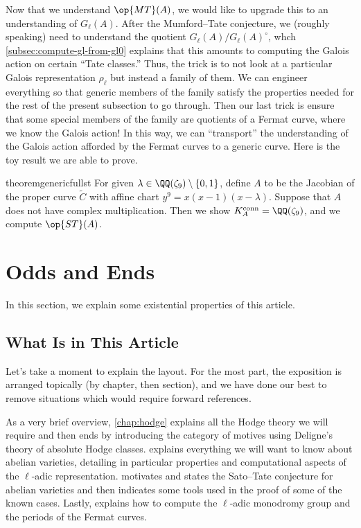 \documentclass[openany]{book}
\begin{document}
Now that we understand $\op{MT}(A)$, we would like to upgrade this to an understanding of $G_\ell(A)$. After the Mumford--Tate conjecture, we (roughly speaking) need to understand the quotient $G_\ell(A)/G_\ell(A)^\circ$, whch \cref{subsec:compute-gl-from-gl0} explains that this amounts to computing the Galois action on certain ``Tate classes.'' Thus, the trick is to not look at a particular Galois representation $\rho_\ell$ but instead a family of them. We can engineer everything so that generic members of the family satisfy the properties needed for the rest of the present subsection to go through. Then our last trick is ensure that some special members of the family are quotients of a Fermat curve, where we know the Galois action! In this way, we can ``transport'' the understanding of the Galois action afforded by the Fermat curves to a generic curve. Here is the toy result we are able to prove.
\begin{restatable*}{theorem}{genericfullst}
	For given $\lambda\in\QQ(\zeta_9)\setminus\{0,1\}$, define $A$ to be the Jacobian of the proper curve $\widetilde C$ with affine chart $y^9=x(x-1)(x-\lambda)$. Suppose that $A$ does not have complex multiplication. Then we show $K_A^{\mathrm{conn}}=\QQ(\zeta_9)$, and we compute $\op{ST}(A)$.
\end{restatable*}

\section{Odds and Ends}
In this section, we explain some existential properties of this article.

\subsection{What Is in This Article}
Let's take a moment to explain the layout. For the most part, the exposition is arranged topically (by chapter, then section), and we have done our best to remove situations which would require forward references.

As a very brief overview, \cref{chap:hodge} explains all the Hodge theory we will require and then ends by introducing the category of motives using Deligne's theory of absolute Hodge classes.  explains everything we will want to know about abelian varieties, detailing in particular properties and computational aspects of the $\ell$-adic representation.  motivates and states the Sato--Tate conjecture for abelian varieties and then indicates some tools used in the proof of some of the known cases. Lastly,  explains how to compute the $\ell$-adic monodromy group and the periods of the Fermat curves.
\end{document}
